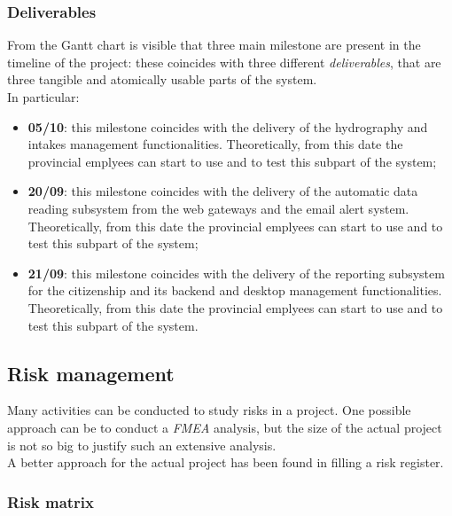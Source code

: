 \subsubsection{Deliverables}
From the Gantt chart is visible that three main milestone are present in the timeline of the project: these coincides with three different \textit{deliverables}, that are three tangible and atomically usable parts of the system.\\
In particular:
\begin{itemize}
    \item \textbf{05/10}: this milestone coincides with the delivery of the hydrography and intakes management functionalities. Theoretically, from this date the provincial emplyees can start to use and to test this subpart of the system;
    \item \textbf{20/09}: this milestone coincides with the delivery of the automatic data reading subsystem from the web gateways and the email alert system. Theoretically, from this date the provincial emplyees can start to use and to test this subpart of the system;
    \item \textbf{21/09}: this milestone coincides with the delivery of the reporting subsystem for the citizenship and its backend and desktop management functionalities. Theoretically, from this date the provincial emplyees can start to use and to test this subpart of the system.
\end{itemize}

\subsection{Risk management}
Many activities can be conducted to study risks in a project. One possible approach can be to conduct a \textit{FMEA} analysis, but the size of the actual project is not so big to justify such an extensive analysis. \\
A better approach for the actual project has been found in filling a risk register.
\subsubsection{Risk matrix}

